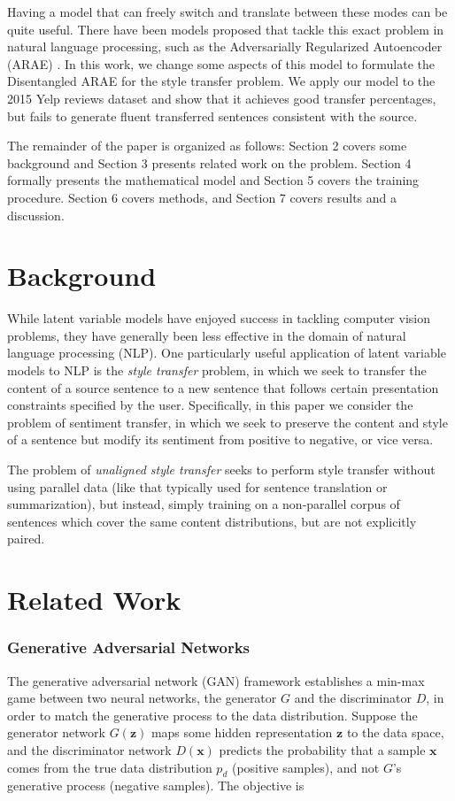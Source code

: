 \documentclass{article}
\newcommand{\vect}[1]{\boldsymbol{#1}}
\begin{document}
Having a model that can freely switch and translate between these modes can be quite useful.  There have been models proposed that tackle this exact problem in natural language processing, such as the Adversarially Regularized Autoencoder (ARAE) \cite{arae}.  In this work, we change some aspects of this model to formulate the Disentangled ARAE for the style transfer problem. We apply our model to the 2015 Yelp reviews dataset \cite{yelp} and show that it achieves good transfer percentages, but fails to generate fluent transferred sentences consistent with the source.

The remainder of the paper is organized as follows: Section 2 covers some background and Section 3 presents related work on the problem.  Section 4 formally presents the mathematical model and Section 5 covers the training procedure.  Section 6 covers methods, and Section 7 covers results and a discussion.  

\section{Background}
While latent variable models have enjoyed success in tackling computer vision problems, they have generally been less effective in the domain of natural language processing (NLP).  One particularly useful application of latent variable models to NLP is the \emph{style transfer} problem, in which we seek to transfer the content
of a source sentence to a new sentence that follows certain presentation constraints specified by the user. Specifically, in this paper we consider the problem of sentiment transfer, in which we seek to preserve the content and style of a sentence but modify its sentiment from positive to negative, or vice versa.

The problem of \emph{unaligned style transfer} seeks to perform style transfer without using parallel data (like that typically used for sentence translation or summarization), but instead, simply training on a non-parallel corpus of sentences which cover the same content distributions, but are not explicitly paired.


\section{Related Work}

\subsubsection{Generative Adversarial Networks} \label{sssec:gan}
The generative adversarial network (GAN) \cite{gan} framework establishes a min-max game between two neural networks, the generator $G$ and the discriminator $D$, in order to match the generative process to the data distribution. Suppose the generator network $G(\vect{z})$ maps some hidden representation $\vect{z}$ to the data space, and the discriminator network $D(\vect{x})$ predicts the probability that a sample $\vect{x}$ comes from the true data distribution $p_d$ (positive samples), and not $G$'s generative process (negative samples). The objective is
\end{document}
